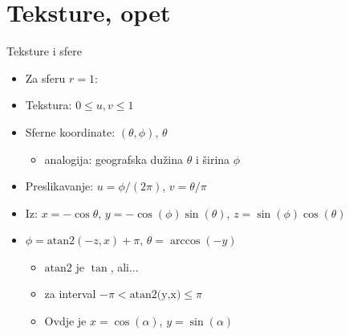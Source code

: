 \documentclass[9pt]{beamer}
\begin{document}
\section{Teksture, opet}
\begin{frame}{Teksture i sfere}
	\begin{itemize}
		\item Za sferu $r=1$:
		\item Tekstura: $0 \leq u,v \leq 1$
		\item Sferne koordinate: $(\theta, \phi)$, $\theta$
		\begin{itemize}
			\item analogija: geografska dužina $\theta$ i širina $\phi$
		\end{itemize}
		\item Preslikavanje: $u = \phi/(2 \pi)$, $v = \theta / \pi$
		\item Iz: $x = -\cos \theta$, $y = -\cos (\phi) \sin (\theta)$, $z = \sin (\phi) \cos (\theta)$
		\item $\phi = \text{atan2}(-z, x) + \pi$, $\theta= \arccos(-y)$
		\begin{itemize}
			\item $\text{atan2}$ je $\tan$, ali...
			\item za interval $-\pi < \text{atan2(y,x)} \leq \pi$
			\item Ovdje je $x = \cos(\alpha)$, $y = \sin (\alpha)$
		\end{itemize}
	\end{itemize}
\end{frame}
\end{document}
